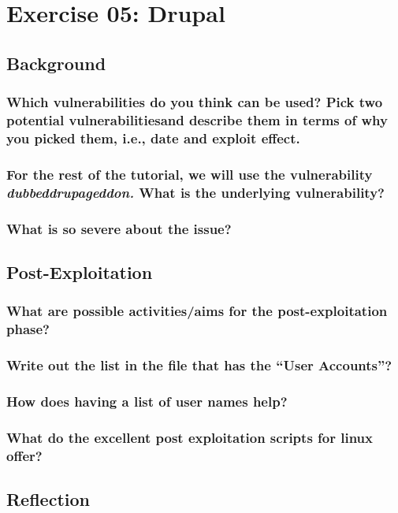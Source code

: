 \section{Exercise 05: Drupal}
\subsection{Background}
\subsubsection{Which vulnerabilities do you think can be used? Pick two potential vulnerabilitiesand describe them in terms of why you picked them, i.e., date and exploit effect.}
\subsubsection{For the rest of the tutorial, we will use the vulnerability \textit{dubbeddrupageddon.} What is the underlying vulnerability?}
\subsubsection{What is so severe about the issue?}

\subsection{Post-Exploitation}

\subsubsection{What are possible activities/aims for the post-exploitation phase?}
\subsubsection{Write out the list in the file that has the “User Accounts”?}
\subsubsection{How does having a list of user names help?}
\subsubsection{What do the excellent post exploitation scripts for linux offer?}

\subsection{Reflection}

